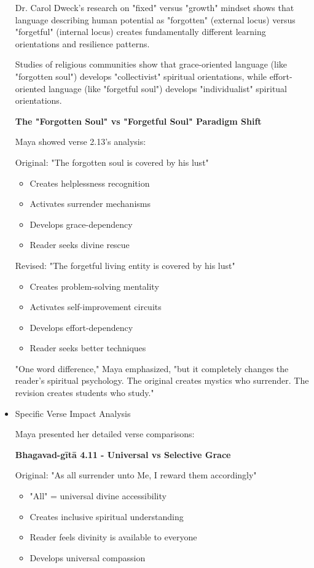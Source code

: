 \documentclass[11pt,twoside]{book}
\begin{document}
\begin{itemize}
Dr. Carol Dweck's research on "fixed" versus "growth" mindset shows that language describing human potential as "forgotten" (external locus) versus "forgetful" (internal locus) creates fundamentally different learning orientations and resilience patterns.

Studies of religious communities show that grace-oriented language (like "forgotten soul") develops "collectivist" spiritual orientations, while effort-oriented language (like "forgetful soul") develops "individualist" spiritual orientations.

\textbf{\textbf{The "Forgotten Soul" vs "Forgetful Soul" Paradigm Shift}}

Maya showed verse 2.13's analysis:

Original: "The forgotten soul is covered by his lust"
\begin{itemize}
\item Creates helplessness recognition
\item Activates surrender mechanisms
\item Develops grace-dependency
\item Reader seeks divine rescue
\end{itemize}

Revised: "The forgetful living entity is covered by his lust"
\begin{itemize}
\item Creates problem-solving mentality
\item Activates self-improvement circuits
\item Develops effort-dependency
\item Reader seeks better techniques
\end{itemize}

"One word difference," Maya emphasized, "but it completely changes the reader's spiritual psychology. The original creates mystics who surrender. The revision creates students who study."
\item Specific Verse Impact Analysis
\label{sec:org3295097}

Maya presented her detailed verse comparisons:

\textbf{\textbf{Bhagavad-gītā 4.11 - Universal vs Selective Grace}}

Original: "As all surrender unto Me, I reward them accordingly"
\begin{itemize}
\item "All" = universal divine accessibility
\item Creates inclusive spiritual understanding
\item Reader feels divinity is available to everyone
\item Develops universal compassion
\end{itemize}


\end{itemize}
\end{document}
